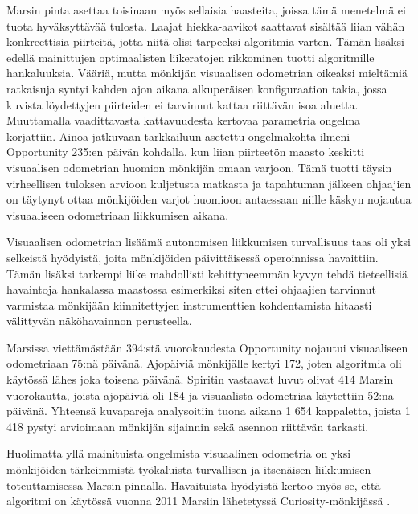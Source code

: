\documentclass[finnish]{tktltiki2}
\theoremstyle{definition}
\theoremstyle{remark}
\begin{document}
Marsin pinta asettaa toisinaan myös sellaisia haasteita, joissa tämä menetelmä ei tuota hyväksyttävää tulosta. Laajat hiekka-aavikot saattavat sisältää liian vähän konkreettisia piirteitä, jotta niitä olisi tarpeeksi algoritmia varten. Tämän lisäksi edellä mainittujen optimaalisten liikeratojen rikkominen tuotti algoritmille hankaluuksia. Vääriä, mutta mönkijän visuaalisen odometrian oikeaksi mieltämiä ratkaisuja syntyi kahden ajon aikana alkuperäisen konfiguraation takia, jossa kuvista löydettyjen piirteiden ei tarvinnut kattaa riittävän isoa aluetta. Muuttamalla vaadittavasta kattavuudesta kertovaa parametria ongelma korjattiin. Ainoa jatkuvaan tarkkailuun asetettu ongelmakohta ilmeni Opportunity 235:en päivän kohdalla, kun liian piirteetön maasto keskitti visuaalisen odometrian huomion mönkijän omaan varjoon. Tämä tuotti täysin virheellisen tuloksen arvioon kuljetusta matkasta ja tapahtuman jälkeen ohjaajien on täytynyt ottaa mönkijöiden varjot huomioon antaessaan niille käskyn nojautua visuaaliseen odometriaan liikkumisen aikana. 

Visuaalisen odometrian lisäämä autonomisen liikkumisen turvallisuus taas oli yksi selkeistä hyödyistä, joita mönkijöiden päivittäisessä operoinnissa havaittiin. Tämän lisäksi tarkempi liike mahdollisti kehittyneemmän kyvyn tehdä tieteellisiä havaintoja hankalassa maastossa esimerkiksi siten ettei ohjaajien tarvinnut varmistaa mönkijään kiinnitettyjen instrumenttien kohdentamista hitaasti välittyvän näköhavainnon perusteella.

Marsissa viettämästään 394:stä vuorokaudesta Opportunity nojautui visuaaliseen odometriaan 75:nä päivänä. Ajopäiviä mönkijälle kertyi 172, joten algoritmia oli käytössä lähes joka toisena päivänä. Spiritin vastaavat luvut olivat 414 Marsin vuorokautta, joista ajopäiviä oli 184 ja visuaalista odometriaa käytettiin 52:na päivänä. Yhteensä kuvapareja analysoitiin tuona aikana 1 654 kappaletta, joista 1 418 pystyi arvioimaan mönkijän sijainnin sekä asennon riittävän tarkasti. \cite{cheng2005visual}

Huolimatta yllä mainituista ongelmista visuaalinen odometria on yksi mönkijöiden tärkeimmistä työkaluista turvallisen ja itsenäisen liikkumisen toteuttamisessa Marsin pinnalla. Havaituista hyödyistä kertoo myös se, että algoritmi on käytössä vuonna 2011 Marsiin lähetetyssä Curiosity-mönkijässä \cite{grotzinger2012mars}.







% 
\end{document}
